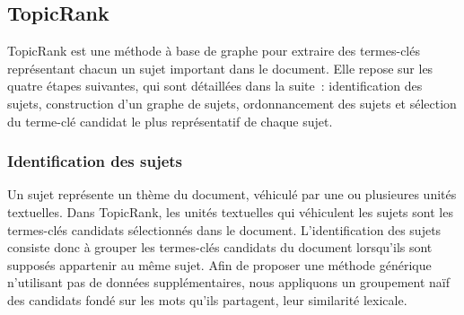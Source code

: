     \subsection{TopicRank}
    \label{subsec:main:domain_independent_keyphrase_extraction-unsupervised_automatic_keyphrase_extraction-topicrank}
      TopicRank est une méthode à base de graphe pour extraire des termes-clés
      représentant chacun un sujet important dans le document.
      Elle repose sur les quatre étapes suivantes, qui sont détaillées dans
      la suite~: identification des sujets, construction d'un graphe de sujets,
      ordonnancement des sujets et sélection du terme-clé candidat le plus
      représentatif de chaque sujet.

      \subsubsection{Identification des sujets}
      \label{subsubsec:main:domain_independent_keyphrase_extraction-unsupervised_automatic_keyphrase_extraction-topicrank-topic_identification}
        Un sujet représente un thème du document, véhiculé par une ou plusieures
        unités textuelles. Dans TopicRank, les unités textuelles qui véhiculent
        les sujets sont les termes-clés candidats sélectionnés dans le document.
%
%
        L'identification des sujets consiste donc à grouper les termes-clés
        candidats du document lorsqu'ils sont supposés appartenir au même sujet.
        Afin de proposer une méthode générique n'utilisant pas de données
        supplémentaires, nous appliquons un groupement \og{}naïf\fg{} des
        candidats fondé sur les mots qu'ils partagent, leur similarité lexicale.

